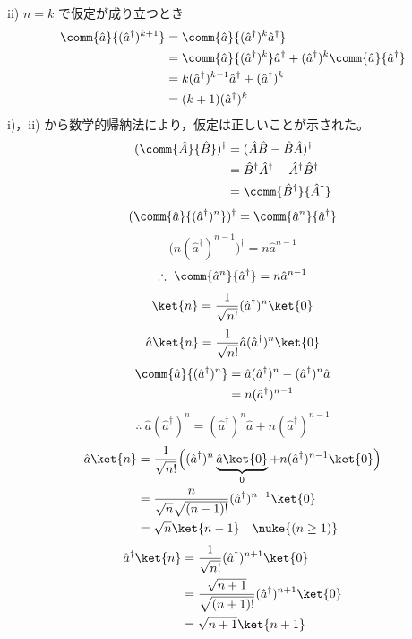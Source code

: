ii) $n=k$ で仮定が成り立つとき
\begin{align*}
\comm{\hat{a}}{(\hat{a}^{\dagger})^{k+1}}&=\comm{\hat{a}}{(\hat{a}^{\dagger})^{k}\hat{a}^{\dagger}}\\
&=\comm{\hat{a}}{(\hat{a}^{\dagger})^{k}}\hat{a}^{\dagger}+(\hat{a}^{\dagger})^{k}\comm{\hat{a}}{\hat{a}^{\dagger}}\\
&=k(\hat{a}^{\dagger})^{k-1}\hat{a}^{\dagger}+(\hat{a}^{\dagger})^{k}\\
&=(k+1)(\hat{a}^{\dagger})^{k}
\end{align*}
i)，ii) から数学的帰納法により，仮定は正しいことが示された。
\begin{align*}
(\comm{\hat{A}}{\hat{B}})^{\dagger}&=(\hat{A}\hat{B}-\hat{B}\hat{A})^{\dagger}\\
&=\hat{B}^{\dagger}\hat{A}^{\dagger}-\hat{A}^{\dagger}\hat{B}^{\dagger}\\
&=\comm{\hat{B}^{\dagger}}{\hat{A}^{\dagger}}
\end{align*}
\[ (\comm{\hat{a}}{(\hat{a}^{\dagger})^{n}})^{\dagger}=\comm{\hat{a}^{n}}{\hat{a}^{\dagger}} \]
\[ \bigl(n(\hat{a}^{\dagger})^{n-1}\bigr)^{\dagger}=n\hat{a}^{n-1} \]
\[ \therefore\ \comm{\hat{a}^{n}}{\hat{a}^{\dagger}}=n\hat{a}^{n-1} \]
\[ \ket{n}=\frac{1}{\sqrt{n!}}(\hat{a}^{\dagger})^{n}\ket{0} \]
\[ \hat{a}\ket{n}=\frac{1}{\sqrt{n!}}\hat{a}(\hat{a}^{\dagger})^{n}\ket{0} \]
\begin{align*}
\comm{\hat{a}}{(\hat{a}^{\dagger})^{n}}&=\hat{a}(\hat{a}^{\dagger})^{n}-(\hat{a}^{\dagger})^{n}\hat{a}\\
&=n(\hat{a}^{\dagger})^{n-1}
\end{align*}
\[ \therefore\ \hat{a}(\hat{a}^{\dagger})^{n}=(\hat{a}^{\dagger})^{n}\hat{a}+n(\hat{a}^{\dagger})^{n-1} \]
\begin{align*}
\hat{a}\ket{n}&=\frac{1}{\sqrt{n!}}\Bigl((\hat{a}^{\dagger})^{n}\underbrace{\hat{a}\ket{0}}_{0}+n(\hat{a}^{\dagger})^{n-1}\ket{0}\Bigr)\\
&=\frac{n}{\sqrt{n}\sqrt{(n-1)!}}(\hat{a}^{\dagger})^{n-1}\ket{0}\\
&=\sqrt{n}\ket{n-1}\quad\nuke{(n\ge1)}
\end{align*}
\begin{align*}
\hat{a}^{\dagger}\ket{n}&=\frac{1}{\sqrt{n!}}(\hat{a}^{\dagger})^{n+1}\ket{0}\\
&=\frac{\sqrt{n+1}}{\sqrt{(n+1)!}}(\hat{a}^{\dagger})^{n+1}\ket{0}\\
&=\sqrt{n+1}\ket{n+1}
\end{align*}
